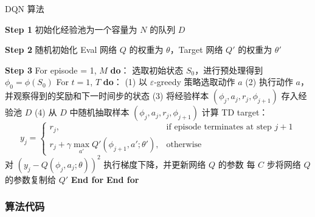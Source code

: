 \begin{algorithm}[H]
    \caption{DQN 算法}
    \SetAlgoLined
    \DontPrintSemicolon
      
    \textbf{Step 1} 初始化经验池为一个容量为 \( N \) 的队列 \( D \)\;
    
    \textbf{Step 2} 随机初始化 Eval 网络 \( Q \) 的权重为 \( \theta \)，Target 网络 \( Q' \) 的权重为 \( \theta' \)\;
    
    \textbf{Step 3} For episode = 1, \( M \) \textbf{do}：\;
      \quad 选取初始状态 \( S_0 \)，进行预处理得到 \( \phi_0 = \phi(S_0) \)\;
      \quad For \( t=1 \), \( T \) \textbf{do}：\;
        \quad (1) 以 \(\varepsilon\)-greedy 策略选取动作 \( a \)\;
        \quad (2) 执行动作 \( a \)，并观察得到的奖励和下一时间步的状态\;
        \quad (3) 将经验样本 \( (\phi_j, a_j, r_j, \phi_{j+1}) \) 存入经验池 \( D \)\;
        \quad (4) 从 \( D \) 中随机抽取样本 \( (\phi_j, a_j, r_j, \phi_{j+1}) \) 计算 TD target：
        \[
        y_j = 
        \begin{cases} 
        r_j, & \text{if episode terminates at step } j + 1 \\
        r_j + \gamma \max_{a'} Q'(\phi_{j+1}, a'; \theta'), & \text{otherwise}
        \end{cases}
        \]
        \quad 对 \( (y_j - Q(\phi_j, a_j; \theta))^2 \) 执行梯度下降，并更新网络 \( Q \) 的参数\;
        \quad 每 \( C \) 步将网络 \( Q \) 的参数复制给 \( Q' \)\;
      \quad \textbf{End for}\;
    \textbf{End for}
    \end{algorithm}


\subsubsection{算法代码}

